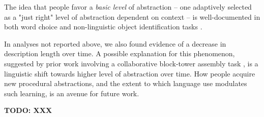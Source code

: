 \documentclass[10pt,letterpaper]{article}
\begin{document}
The idea that people favor a \textit{basic level} of abstraction -- one adaptively selected as a "just right" level of abstraction dependent on context -- is well-documented in both word choice and non-linguistic object identification tasks . 

In analyses not reported above, we also found evidence of a decrease in description length over time. 
A possible explanation for this phenomenon, suggested by prior work involving a collaborative block-tower assembly task \cite{mccarthy2021learning}, is a linguistic shift towards higher level of abstraction over time.
How people acquire new procedural abstractions, and the extent to which language use modulates such learning, is an avenue for future work.





\textbf{TODO: XXX}

\end{document}
